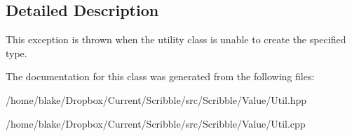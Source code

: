 \subsection{Detailed Description}
This exception is thrown when the utility class is unable to create the specified type. 

The documentation for this class was generated from the following files\-:\begin{DoxyCompactItemize}
\item 
/home/blake/\-Dropbox/\-Current/\-Scribble/src/\-Scribble/\-Value/Util.\-hpp\item 
/home/blake/\-Dropbox/\-Current/\-Scribble/src/\-Scribble/\-Value/Util.\-cpp\end{DoxyCompactItemize}
